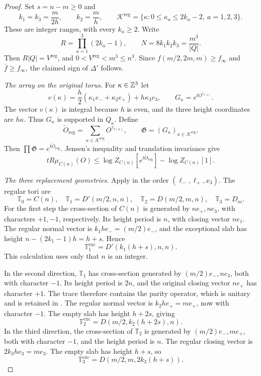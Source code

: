 \begin{proof}
Set $s=n-m\ge0$ and
\[
 k_1=k_3=\frac{m}{2h},\qquad k_2=\frac mh,\qquad
 \mathcal K^{\mathrm{reg}}=
   \{\kappa:0\le\kappa_a\le2k_a-2,\ a=1,2,3\}.
\]
These are integer ranges, with every $k_a\ge2$. Write
\[
 R=\prod_{a=1}^3(2k_a-1),\qquad
 N=8k_1k_2k_3=\frac{m^3}{|Q|}.
\]
Then $R|Q|=V^{\mathrm{reg}}$, and
$0<V^{\mathrm{reg}}<m^3\le n^3$. Since
$f(m/2,2m,m)\ge f_\infty$ and $\bar f\ge f_\infty$,
the claimed sign of $\Delta'$ follows.

\emph{The array on the original torus.}
For $\kappa\in\mathbb Z^3$ let
\[
 v(\kappa)=\frac h2(\kappa_1e_-+\kappa_2e_+)
                         +h\kappa_3e_3,\qquad
 G_\kappa=e^{tO^{\tau_{v(\kappa)}}}.
\]
The vector $v(\kappa)$ is integral because $h$ is even, and its
three height coordinates are $h\kappa$. Thus $G_\kappa$ is
supported in $Q_\kappa$. Define
\[
 \widetilde O_{\mathrm{reg}}
     =\sum_{\kappa\in\mathcal K^{\mathrm{reg}}}
                               O^{\tau_{v(\kappa)}},\qquad
 \mathfrak G=(G_\kappa)_{\kappa\in\mathcal K^{\mathrm{reg}}}.
\]
Then $\prod\mathfrak G=e^{t\widetilde O_{\mathrm{reg}}}$.
Jensen's inequality and translation invariance give
\begin{equation}\label{eq:sides-jensen}
 tR\mu_{C(n)}(O)
 \le\log Z_{C(n)}[e^{t\widetilde O_{\mathrm{reg}}}]
                            -\log Z_{C(n)}[1].
\end{equation}

\emph{The three replacement geometries.}
Apply  in the order
$(\ell_-,\ell_+,x_3)$. The regular tori are
\[
 \mathbb T_0=C(n),\quad
 \mathbb T_1=D'(m/2,n,n),\quad
 \mathbb T_2=D(m/2,m,n),\quad
 \mathbb T_3=D_m.
\]
For the first step the cross-section of $C(n)$ is generated by
$ne_+,ne_3$, with characters $+1,-1$, respectively. Its height
period is $n$, with closing vector $ne_1$. The regular normal
vector is $k_1he_-=(m/2)e_-$, and the exceptional slab has height
$n-(2k_1-1)h=h+s$. Hence
\[
 \mathbb T_1^{\mathrm{exc}}=D'(k_1(h+s),n,n).
\]
This calculation uses only that $n$ is an integer.

In the second direction, $\mathbb T_1$ has cross-section generated
by $(m/2)e_-,ne_3$, both with character $-1$. Its height period is
$2n$, and the original closing vector $ne_+$ has character $+1$.
The trace therefore contains the parity operator, which is unitary
and is retained in . The regular
normal vector is $k_2he_+=me_+$, now with character $-1$.
The empty slab has height $h+2s$, giving
\[
 \mathbb T_2^{\mathrm{exc}}=D(m/2,k_2(h+2s),n).
\]
In the third direction, the cross-section of $\mathbb T_2$ is
generated by $(m/2)e_-,me_+$, both with character $-1$, and the
height period is $n$. The regular closing vector is $2k_3he_3=me_3$.
The empty slab has height $h+s$, so
\[
 \mathbb T_3^{\mathrm{exc}}=D(m/2,m,2k_3(h+s)).
\]


\end{proof}
